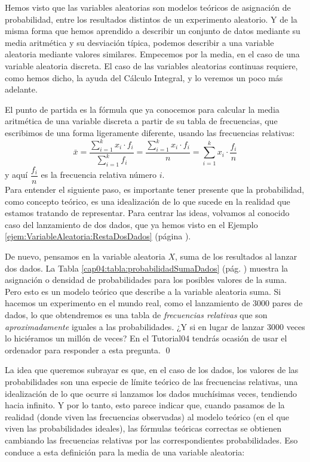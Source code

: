 Hemos visto que las variables aleatorias son modelos teóricos de asignación de probabilidad, entre los resultados distintos de un experimento aleatorio. Y de la misma forma que hemos aprendido a describir un conjunto de datos mediante su media aritmética y su desviación típica, podemos
describir a una variable aleatoria mediante valores similares. Empecemos por la media, en el caso de una variable aleatoria discreta. El caso de las variables aleatorias continuas requiere, como hemos dicho, la ayuda del Cálculo Integral, y lo veremos un poco más adelante.

El punto de partida es la fórmula que ya conocemos para calcular la media aritmética de una variable discreta a partir de su tabla de frecuencias, que escribimos de una forma ligeramente diferente, usando las frecuencias relativas:
    \[
    \bar x=\dfrac{\displaystyle\sum_{i=1}^k x_i\cdot f_i}{\displaystyle\sum_{i=1}^k f_i}
    =\dfrac{\displaystyle\sum_{i=1}^k x_i\cdot f_i}{n}
    =\displaystyle\sum_{i=1}^k x_i\cdot \dfrac{f_i}{n}
    \]
y aquí $\dfrac{f_i}{n}$ es la frecuencia relativa número $i$.\\[3mm]
Para entender el siguiente paso, es importante tener presente que la probabilidad, como concepto teórico, es una idealización de lo que sucede en la realidad que estamos tratando de representar. Para centrar las ideas, volvamos al conocido caso del lanzamiento de dos dados, que ya hemos visto en el Ejemplo \ref{ejem:VariableAleatoria:RestaDosDados} (página \pageref{ejem:VariableAleatoria:RestaDosDados}).
\begin{Ejemplo}
\label{ejem:Cap04-VariableAleatoria:SumaDosDados}
    De nuevo, pensamos en la variable aleatoria $X$, suma de los resultados al lanzar dos dados.
    La Tabla \ref{cap04:tabla:probabilidadSumaDados} (pág. \pageref{cap04:tabla:probabilidadSumaDados}) muestra la asignación o densidad de probabilidades para los posibles valores de la suma. Pero esto es un modelo teórico que describe a la variable aleatoria suma. Si hacemos un experimento en el mundo real, como el lanzamiento de 3000 pares de dados, lo que obtendremos es una tabla de {\em frecuencias relativas} que son {\em aproximadamente} iguales a las probabilidades. ¿Y si en lugar de lanzar 3000 veces lo hiciéramos un millón de veces? En el Tutorial04 tendrás ocasión de usar el ordenador para responder a esta pregunta.
    \qed
\end{Ejemplo}
La idea que queremos subrayar es que, en el caso de los dados, los valores de las probabilidades son una especie de límite teórico de las frecuencias relativas, una idealización de lo que ocurre si lanzamos los dados muchísimas veces, tendiendo hacia infinito. Y por lo tanto, esto parece indicar que, cuando pasamos de la realidad (donde viven las frecuencias observadas) al modelo teórico (en el que viven las probabilidades ideales), las fórmulas teóricas correctas se obtienen cambiando las frecuencias relativas por las correspondientes probabilidades. Eso conduce a esta definición para la media de una variable aleatoria:
